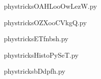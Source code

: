     

    \clearpage
    


    \newcommand{\CaptionFigOAHLooOwLezW}{<+Type your caption here+>}
    \begin{center}
        
    \end{center}
    phystricksOAHLooOwLezW.py

    

    \clearpage
    


    \newcommand{\CaptionFigOZXooCVkgQ}{<+Type your caption here+>}
    \begin{center}
        
    \end{center}
    phystricksOZXooCVkgQ.py

    

    \clearpage
    


    \newcommand{\CaptionFigETfnbsh}{<+Type your caption here+>}
    \begin{center}
        
    \end{center}
    phystricksETfnbsh.py

    

    \clearpage
    


    \newcommand{\CaptionFigHistoPySeT}{<+Type your caption here+>}
    \begin{center}
        
    \end{center}
    phystricksHistoPySeT.py

    

    \clearpage
    


    \newcommand{\CaptionFigbDdpfh}{<+Type your caption here+>}
    \begin{center}
        
    \end{center}
    phystricksbDdpfh.py

    

    \clearpage
    


